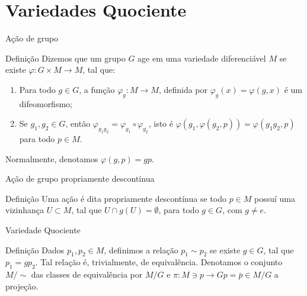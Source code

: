 \documentclass[aspectratio=169]{beamer}
\begin{document}
\begin{frame}
\begin{center}
	\end{center}
\end{frame}

\section{Variedades Quociente}

\begin{frame}{Ação de grupo}
	\begin{block}{Definição}
		Dizemos que um grupo $G$ age em uma variedade diferenciável $M$ se existe $\varphi:G\times M\to M$, tal que:
		\pause

		\begin{enumerate}
			\item Para todo $g \in G$, a função $\varphi_{g}:M\to M$, definida por $\varphi_{g}(x)=\varphi(g, x)$ é um difeomorfismo;
			      \pause

			\item Se $g_{1}, g_{2} \in G$, então $\varphi_{g_{1}g_{2}}=\varphi_{g_{1}}\circ\varphi_{g_{2}}$, isto é $\varphi(g_{1}, \varphi(g_{2}, p))=\varphi (g_{1}g_{2}, p)$ para todo $p \in M$.
		\end{enumerate}
		Normalmente, denotamos $\varphi(g,p)=gp$.
	\end{block}
\end{frame}

\begin{frame}{Ação de grupo propriamente descontínua}
	\begin{block}{Definição}
		Uma ação é dita propriamente descontínua se todo $p \in M$ possuí uma vizinhança $U \subset M$, tal que $U \cap g(U)=\emptyset$, para todo $g \in G$, com $g\neq e$.
	\end{block}
\end{frame}

\begin{frame}{Variedade Quociente}
	\begin{block}{Definição}
		Dados $p_{1}, p_{2} \in M$, definimos a relação $p_{1} \sim  p_{2}$ se existe $g \in G$, tal que $p_{1}=gp_{2}$. Tal relação é, trivialmente, de equivalência. Denotamos o conjunto $M/\sim$ das classes de equivalência por $M/G$ e $\pi:M \ni p\to Gp=\bar{p} \in M/G$ a projeção.
	\end{block}
\end{frame}
\end{document}
